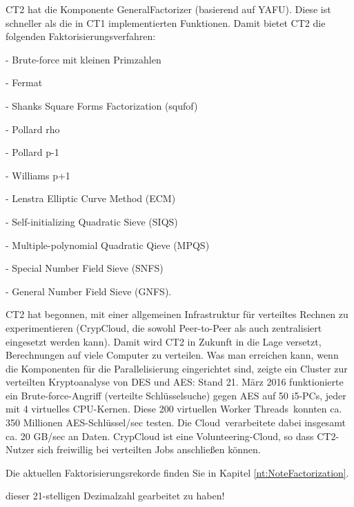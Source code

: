 \begin{refsegment}
{  \noindent CT2 hat die Komponente GeneralFactorizer
  (basierend auf YAFU). Diese ist schneller als die in CT1
  implementierten Funktionen.
  Damit bietet CT2 die folgenden Faktorisierungsverfahren:
  \begin{compactitem}
   \item[-] Brute-force mit kleinen Primzahlen
   \item[-] Fermat
   \item[-] Shanks Square Forms Factorization (squfof)
   \item[-] Pollard rho
   \item[-] Pollard p-1
   \item[-] Williams p+1
   \item[-] Lenstra Elliptic Curve Method (ECM)
   \item[-] Self-initializing Quadratic Sieve (SIQS)
   \item[-] Multiple-polynomial Quadratic Qieve (MPQS)
   \item[-] Special Number Field Sieve (SNFS)
   \item[-] General Number Field Sieve (GNFS).
  \end{compactitem}

  \noindent CT2 hat begonnen, mit einer allgemeinen Infrastruktur für verteiltes
  Rechnen zu experimentieren (CrypCloud, die sowohl Peer-to-Peer
  als auch zentralisiert eingesetzt werden kann). Damit wird CT2 in Zukunft in die
  Lage versetzt, Berechnungen auf viele Computer zu verteilen.
  Was man erreichen kann, wenn die Komponenten für die Parallelisierung eingerichtet
  sind, zeigte ein Cluster zur verteilten Kryptoanalyse von DES und AES:
  Stand 21. März 2016 funktionierte ein Brute-force-Angriff (verteilte Schlüsselsuche)
  gegen AES auf 50 i5-PCs, jeder mit 4 virtuelles CPU-Kernen. Diese 200 virtuellen
  \glqq Worker Threads\grqq~konnten ca. 350 Millionen AES-Schlüssel/sec testen. Die
  \glqq Cloud\grqq~verarbeitete dabei insgesamt ca. 20 GB/sec an Daten. CrypCloud
  ist eine Volunteering-Cloud, so dass CT2-Nutzer sich freiwillig bei
  verteilten Jobs anschließen können.

  \noindent Die aktuellen Faktorisierungsrekorde finden Sie in Kapitel
  \ref{nt:NoteFactorization}.
}
dieser 21-stelligen Dezimalzahl gearbeitet zu haben!


\end{refsegment}
